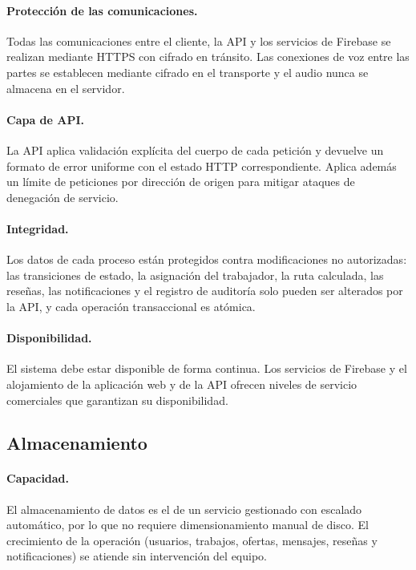 \documentclass[doc,12pt,a4paper]{apa7}
\begin{document}
\paragraph{Protección de las comunicaciones.}
Todas las comunicaciones entre el cliente, la API y los servicios de Firebase se
realizan mediante HTTPS con cifrado en tránsito. Las conexiones de voz entre las
partes se establecen mediante cifrado en el transporte y el audio nunca se
almacena en el servidor.

\paragraph{Capa de API.}
La API aplica validación explícita del cuerpo de cada petición y devuelve un
formato de error uniforme con el estado HTTP correspondiente. Aplica además un
límite de peticiones por dirección de origen para mitigar ataques de
denegación de servicio.

\paragraph{Integridad.}
Los datos de cada proceso están protegidos contra modificaciones no autorizadas:
las transiciones de estado, la asignación del trabajador, la ruta calculada, las
reseñas, las notificaciones y el registro de auditoría solo pueden ser
alterados por la API, y cada operación transaccional es atómica.

\paragraph{Disponibilidad.}
El sistema debe estar disponible de forma continua. Los servicios de Firebase
y el alojamiento de la aplicación web y de la API ofrecen niveles de servicio
comerciales que garantizan su disponibilidad.

\subsection{Almacenamiento}

\paragraph{Capacidad.}
El almacenamiento de datos es el de un servicio gestionado con escalado
automático, por lo que no requiere dimensionamiento manual de disco. El
crecimiento de la operación (usuarios, trabajos, ofertas, mensajes, reseñas y
notificaciones) se atiende sin intervención del equipo.
\end{document}
